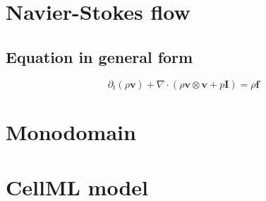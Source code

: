 \documentclass[
10pt, %
a4paper, %
oneside, %
headinclude,footinclude, %
BCOR5mm, %
]{scrartcl}
\begin{document}
\section{Navier-Stokes flow}
%
\subsection{Equation in general form}
%
\begin{equation}
    \partial_{t} (\rho \boldsymbol{v}) + \nabla \cdot (\rho \boldsymbol{v} \otimes \boldsymbol{v} + p \boldsymbol{I}) = \rho \boldsymbol{f}
\end{equation}
%
%
%

%
%
\clearpage
%
\section{Monodomain}
%
%
%
%
\clearpage
%
\section{CellML model}
%
%
%
%
%
\clearpage
%


\end{document}
